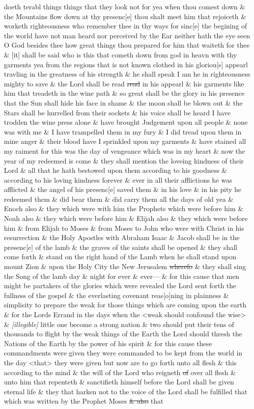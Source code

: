 {doeth terabl things things that they look not for yea when thou comest down \& the Mountains flow down at thy presenc[e] thou shalt meet him that rejoiceth \& worketh righteousness who remember thee in thy ways for sinc[e] the begining of the world have not man heard nor perceived by the Ear neither hath the eye seen O God besides thee how great things thou prepared for him that waiteth for thee \& [it] shall be said who is this that cometh down from god in heavn with thy garments yea from the regions that is not known clothed in his gloriou[s] appearl travling in the greatness of his strength \& he shall speak I am he in righteousness mighty to save \& the Lord shall be read \sout{read} in his appearl \& his garments like him that treadeth in the wine path \& so great shall be the glory in his presence that the Sun shall hide his face in shame \& the moon shall be blown out \& the Stars shall be hurrelled from their sockets \& his voice shall be heard I have trodden the wine press alone \& have brought Judgement upon all people \& none was with me \& I have trampelled them in my fury \& I did tread upon them in mine anger \& their blood have I sprinkled upon my garments \& have stained all my raiment for this was the day of vengeance which was in my heart \& now the year of my redeemed is come \& they shall mention the loveing kindness of their Lord \& all that he hath bestowed upon them according to his goodness \& according to his loving kindness forever \& ever in all their afflictions he was afflicted \& the angel of his presenc[e] saved them \& in his love \& in his pity he redeemed them \& did bear them \& did carry them all the days of old yea \& Enoch also \& they which were with him the Prophets which were before him \& Noah also \& they which were before him \& Elijah also \& they which were before him \& from Elijah to Moses \& from Moses to John who were with Christ in his resurrection \& the Holy Apostles with Abraham Isaac \& Jacob shall be in the presenc[e] of the lamb \& the graves of the saints shall be opened \& they shall come forth \& stand on the right hand of the Lamb when he shall stand upon mount Zion \& upon the Holy City the New Jerusalem \sout{wherefo} \& they shall sing the Song of the lamb day \& night for ever \& ever--- \& for this cause that men might be partakers of the glories which were revealed the Lord sent forth the fullness of the gospel \& the everlasting covenant reas[o]ning in plainness \& simplisity to prepare the weak for those things which are coming upon the earth \& for the Lords Errand in the days when the <weak should confound the wise> \& \textit{[illegible]} little one become a strong nation \& two should put their tens of thousands to flight by the weak things of the Earth the Lord should thresh the Nations of the Earth by the power of his spirit \& for this cause these commandments were given they were commanded to be kept from the world in the day <that> they were given but now are to go forth unto all flesh \& this according to the mind \& the will of the Lord who reigneth \sout{of} over all flesh \& unto him that repenteth \& sanctifieth himself before the Lord shall be given eternal life \& they that harken not to the voice of the Lord shall be fulfilled that which was written by the Prophet Moses \sout{\& also} that }
